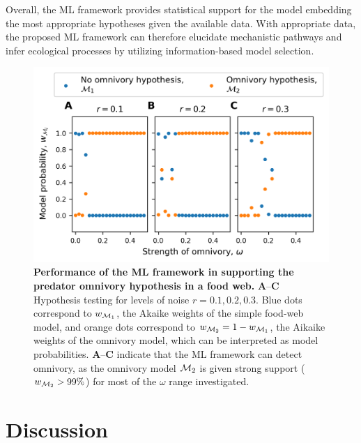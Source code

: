 Overall, the ML framework provides statistical support for the model embedding the most appropriate hypotheses given the available data. With appropriate data, the proposed ML framework can therefore elucidate mechanistic pathways and infer ecological processes by utilizing information-based model selection.

\begin{figure}[ht]
    \centering
    \includegraphics[]{figures/figure5.png}
    \caption{\textbf{Performance of the ML framework in supporting the predator omnivory hypothesis in a food web.}
   \textbf{A}--\textbf{C} Hypothesis testing for levels of noise $r=0.1, 0.2, 0.3$. Blue dots correspond to $w_{\mathcal{M}_1}$, the Akaike weights of the simple food-web model, and orange dots correspond to $w_{\mathcal{M}_2} = 1 - w_{\mathcal{M}_1}$, the Aikaike weights of the omnivory model, which can be interpreted as model probabilities. 
   \textbf{A}--\textbf{C} indicate that the ML framework can detect omnivory, as the omnivory model $\mathcal{M}_2$ is given strong support ($w_{\mathcal{M}_2} > 99\%$) for most of the $\omega$ range investigated.
    }
    \label{fig:AIC_likelihood_comparision_3-compartments-model}
\end{figure}

\FloatBarrier

\section{Discussion}\label{sec:discussion}

